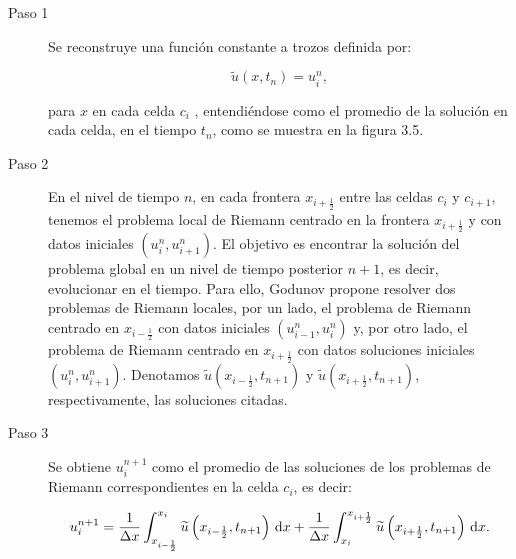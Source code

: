 \begin{description}
    \item[Paso 1]

          Se reconstruye una función constante a trozos deﬁnida por:

          \begin{equation*}
              \widetilde{u}
              \left(x,t_{n}\right)=
              u^{n}_{i},
          \end{equation*}

          para $x$ en cada celda $c_{i}$ , entendiéndose como el promedio
          de la solución en cada celda, en el tiempo $t_{n}$, como se muestra
          en la figura 3.5.

    \item[Paso 2]

          En el nivel de tiempo $n$, en cada frontera $x_{i+\frac{1}{2}}$ entre las
          celdas $c_{i}$ y $c_{i+1}$, tenemos el problema local de
          Riemann centrado en la frontera $x_{i+\frac{1}{2}}$ y con datos iniciales
          $\left(u^{n}_{i},u^{n}_{i+1}\right)$.
          El objetivo es encontrar la solución del problema global en un nivel de
          tiempo posterior $n+1$, es decir, evolucionar en el tiempo.
          Para ello, Godunov propone resolver dos problemas de Riemann locales, por un lado,
          el problema de Riemann centrado en $x_{i-\frac{1}{2}}$ con datos iniciales
          $\left(u^{n}_{i-1},u^{n}_{i}\right)$ y, por otro lado, el problema de Riemann
          centrado en $x_{i+\frac{1}{2}}$ con datos soluciones iniciales $\left(u^{n}_{i},u^{n}_{i+1}\right)$.
          Denotamos $\widetilde{u}\left(x_{i-\frac{1}{2}},t_{n+1}\right)$ y $\widetilde{u}\left(x_{i+\frac{1}{2}},t_{n+1}\right)$,
          respectivamente, las soluciones citadas.

    \item[Paso 3]

          Se obtiene $u^{n+1}_{i}$ como el promedio de las soluciones de los problemas
          de Riemann correspondientes en la celda $c_{i}$, es decir:

          \begin{equation*}
              u^{n+1}_{i}=
              \frac{1}{\Delta x}
              \int_{x_{i-\frac{1}{2}}}^{x_{i}}
              \widetilde{u}\left(x_{i-\frac{1}{2}},t_{n+1}\right)\dl x+
              \frac{1}{\Delta x}
              \int_{x_{i}}^{x_{i+\frac{1}{2}}}
              \widetilde{u}\left(x_{i+\frac{1}{2}},t_{n+1}\right)\dl x.
          \end{equation*}
\end{description}

